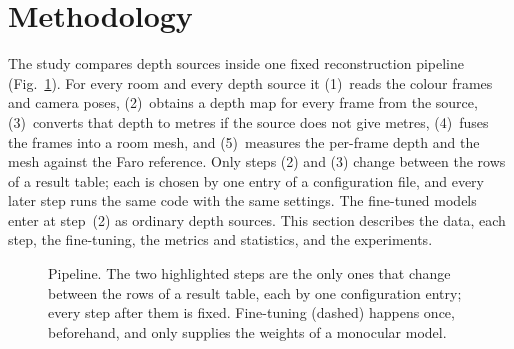 \section{Methodology}\label{sec:method}

The study compares depth sources inside one fixed reconstruction pipeline (Fig.~\ref{fig:pipeline}). For every room
and every depth source it (1)~reads the colour frames and camera poses, (2)~obtains a depth map for every frame from
the source, (3)~converts that depth to metres if the source does not give metres, (4)~fuses the frames into a room
mesh, and (5)~measures the per-frame depth and the mesh against the Faro reference. Only steps (2) and (3) change
between the rows of a result table; each is chosen by one entry of a configuration file, and every later step runs the
same code with the same settings. The fine-tuned models enter at step~(2) as ordinary depth sources. This section
describes the data, each step, the fine-tuning, the metrics and statistics, and the experiments.

\begin{figure}[t]
\centering
{}
\caption{Pipeline. The two highlighted steps are the only ones that change between the rows of a result table, each
by one configuration entry; every step after them is fixed. Fine-tuning (dashed) happens once, beforehand, and only
supplies the weights of a monocular model.}
\label{fig:pipeline}
\end{figure}

